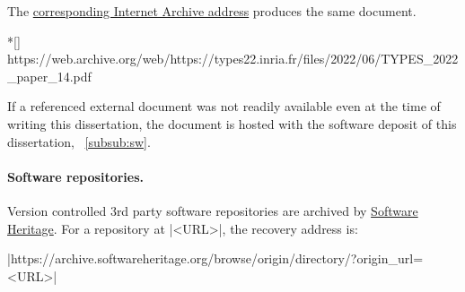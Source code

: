 The \href{https://web.archive.org/web/https://types22.inria.fr/files/2022/06/TYPES_2022_paper_14.pdf}{corresponding Internet Archive address} produces the same document.

\begin{center}
\begin{minipage}{\textwidth}
\begin{cmdlisting}*[]
https://web.archive.org/web/https://types22.inria.fr/files/2022/06/TYPES_2022_paper_14.pdf
\end{cmdlisting}
\end{minipage}
\end{center}

If a referenced external document was not readily available even at the time of writing this dissertation,
the document is hosted with the software deposit of this dissertation, \cf~\autoref{subsub:sw}.

\paragraph*{Software repositories.}
Version controlled 3rd party software repositories are archived by \href{https://softwareheritage.org/}{Software Heritage}.
For a repository at \pr|<URL>|, the recovery address is:

\begin{center}
\pr|https://archive.softwareheritage.org/browse/origin/directory/?origin_url=<URL>|
\end{center}
